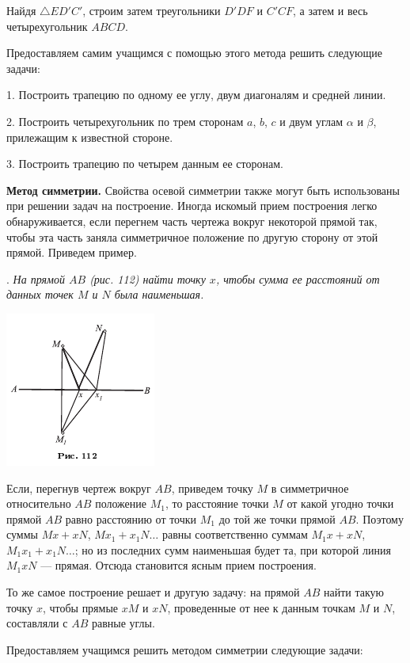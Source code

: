 \documentclass[oneside]{book}
\begin{document}
Найдя $\triangle ED'C'$, строим затем треугольники $D'DF$ и $C'CF$, а затем и весь четырехугольник $ABCD$.

Предоставляем самим учащимся с помощью этого метода решить следующие задачи:

\medskip

1.
Построить трапецию по одному ее углу, двум диагоналям и средней линии.

2.
Построить четырехугольник по трем сторонам $a$, $b$, $c$ и двум углам $\alpha$ и $\beta$, прилежащим к известной стороне.

3.
Построить трапецию по четырем данным ее сторонам.



\textbf{Метод симметрии.}
Свойства осевой симметрии также могут быть использованы при решении задач на построение.
Иногда искомый прием построения легко обнаруживается, если перегнем часть чертежа вокруг некоторой прямой так, чтобы эта часть заняла симметричное положение по другую сторону от этой прямой.
Приведем пример.

.
\emph{На прямой $AB$ \emph{(рис. 112)} найти точку $x$, чтобы сумма ее расстояний от данных точек $M$ и $N$ была наименьшая.}

\includegraphics{pics/ris-112}

Если, перегнув чертеж вокруг $AB$, приведем точку $M$ в симметричное относительно $AB$ положение $M_1$, то расстояние точки $M$ от какой угодно точки прямой $AB$ равно расстоянию от точки $M_1$ до той же точки прямой $AB$.
Поэтому суммы $Mx+xN$,  $Mx_1+x_1N\dots $ равны соответственно суммам $M_1x+xN$, $M_1x_1+x_1N \dots$;
но из последних сумм наименьшая будет та, при которой линия $M_1xN$ — прямая.
Отсюда становится ясным прием построения.

То же самое построение решает и другую задачу:
на прямой $AB$ найти такую точку $x$, чтобы прямые $xM$ и $xN$, проведенные от нее к данным точкам $M$ и $N$, составляли с $AB$ равные углы.

Предоставляем учащимся решить методом симметрии следующие задачи:
\end{document}
